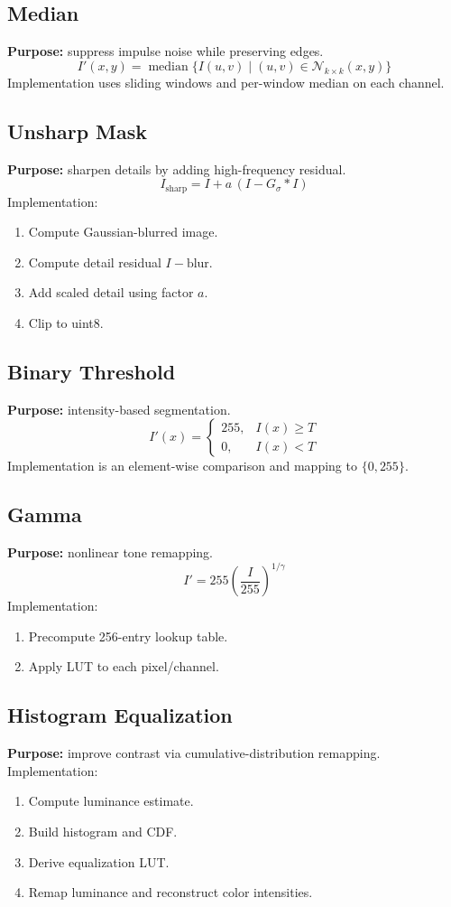 \documentclass[11pt,a4paper]{article}
\begin{document}
\subsection{Median}
\textbf{Purpose:} suppress impulse noise while preserving edges.
\[
I'(x,y)=\operatorname{median}\{I(u,v)\mid (u,v)\in \mathcal{N}_{k\times k}(x,y)\}
\]
Implementation uses sliding windows and per-window median on each channel.

\subsection{Unsharp Mask}
\textbf{Purpose:} sharpen details by adding high-frequency residual.
\[
I_{\text{sharp}} = I + a\,(I - G_\sigma * I)
\]
Implementation:
\begin{enumerate}[leftmargin=1.2cm]
  \item Compute Gaussian-blurred image.
  \item Compute detail residual \(I-\text{blur}\).
  \item Add scaled detail using factor \(a\).
  \item Clip to uint8.
\end{enumerate}

\subsection{Binary Threshold}
\textbf{Purpose:} intensity-based segmentation.
\[
I'(x)=
\begin{cases}
255, & I(x)\ge T\\
0, & I(x)\lt T
\end{cases}
\]
Implementation is an element-wise comparison and mapping to \(\{0,255\}\).

\subsection{Gamma}
\textbf{Purpose:} nonlinear tone remapping.
\[
I' = 255\left(\frac{I}{255}\right)^{1/\gamma}
\]
Implementation:
\begin{enumerate}[leftmargin=1.2cm]
  \item Precompute 256-entry lookup table.
  \item Apply LUT to each pixel/channel.
\end{enumerate}

\subsection{Histogram Equalization}
\textbf{Purpose:} improve contrast via cumulative-distribution remapping.
Implementation:
\begin{enumerate}[leftmargin=1.2cm]
  \item Compute luminance estimate.
  \item Build histogram and CDF.
  \item Derive equalization LUT.
  \item Remap luminance and reconstruct color intensities.
\end{enumerate}
\end{document}
